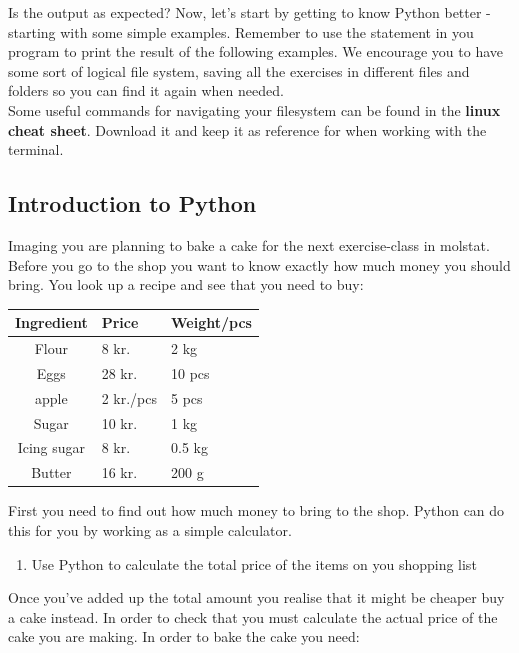 \documentclass{article}
\begin{document}
Is the output as expected?
%
Now, let's start by getting to know Python better - starting with some simple examples. Remember to use the  statement in you program to print the result of the following examples.
We encourage you to have some sort of logical file system, saving all the exercises in different files and folders so you can find it again when needed. \\

Some useful commands for navigating your filesystem can be found in the \textbf{linux cheat sheet}.
Download it and keep it as reference for when working with the terminal.\\

\subsection{Introduction to Python}

Imaging you are planning to bake a cake for the next exercise-class in molstat.
Before you go to the shop you want to know exactly how much money you should bring.
You look up a recipe and see that you need to buy:

\vspace{10pt }
 
\begin{center}
    \begin{tabular}{c l l}
    \hline
    Ingredient & Price & Weight/pcs \\
    \hline
    Flour & 8 kr. & 2 kg \\
    Eggs & 28 kr. & 10 pcs \\
    apple & 2 kr./pcs & 5 pcs \\
    Sugar & 10 kr. & 1 kg \\
    Icing sugar &  8 kr. & 0.5 kg \\
    Butter & 16 kr. & 200 g \\
    \end{tabular}
\end{center}

First you need to find out how much money to bring to the shop.
Python can do this for you by working as a simple calculator.

\begin{enumerate}
    \item Use Python  to calculate the total price of the items on you shopping list  
\end{enumerate}

Once you've added up the total amount you realise that it might be cheaper buy a cake instead.
In order to check that you must calculate the actual price of the cake you are making.
In order to bake the cake you need:
\end{document}
